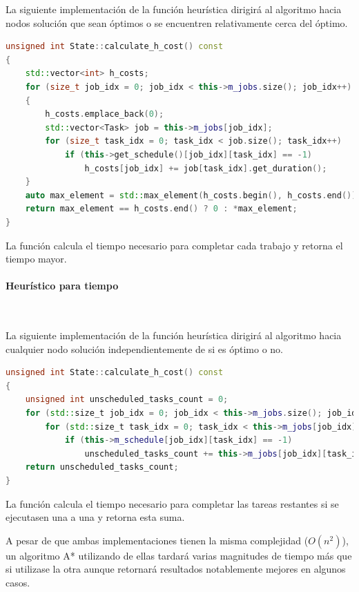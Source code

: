 La siguiente implementación de la función heurística
dirigirá al algoritmo hacia nodos solución que sean óptimos
o se encuentren relativamente cerca del óptimo.

\begin{lstlisting}[language=C++]
unsigned int State::calculate_h_cost() const
{
    std::vector<int> h_costs;
    for (size_t job_idx = 0; job_idx < this->m_jobs.size(); job_idx++)
    {
        h_costs.emplace_back(0);
        std::vector<Task> job = this->m_jobs[job_idx];
        for (size_t task_idx = 0; task_idx < job.size(); task_idx++)
            if (this->get_schedule()[job_idx][task_idx] == -1)
                h_costs[job_idx] += job[task_idx].get_duration();
    }
    auto max_element = std::max_element(h_costs.begin(), h_costs.end());
    return max_element == h_costs.end() ? 0 : *max_element;
}
\end{lstlisting}

La función calcula el tiempo necesario para completar cada trabajo
y retorna el tiempo mayor.

\pagebreak

\paragraph{Heurístico para tiempo}~

La siguiente implementación de la función heurística
dirigirá al algoritmo hacia cualquier nodo solución
independientemente de si es óptimo o no.

\begin{lstlisting}[language=C++]
unsigned int State::calculate_h_cost() const
{
    unsigned int unscheduled_tasks_count = 0;
    for (std::size_t job_idx = 0; job_idx < this->m_jobs.size(); job_idx++)
        for (std::size_t task_idx = 0; task_idx < this->m_jobs[job_idx].size(); task_idx++)
            if (this->m_schedule[job_idx][task_idx] == -1)
                unscheduled_tasks_count += this->m_jobs[job_idx][task_idx].get_duration();
    return unscheduled_tasks_count; 
}
\end{lstlisting}

La función calcula el tiempo necesario para completar
las tareas restantes si se ejecutasen una a una
y retorna esta suma.

\begin{notebox}
    A pesar de que ambas implementaciones tienen la misma complejidad ($O(n^2)$),
    un algoritmo A* utilizando de ellas tardará varias magnitudes de tiempo más que
    si utilizase la otra aunque retornará resultados notablemente mejores en algunos casos.
\end{notebox}


